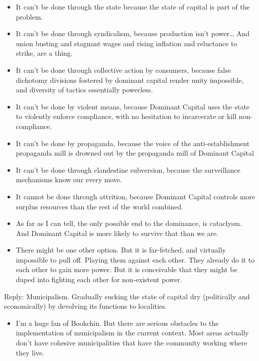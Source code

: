 \documentclass[
]{book}
\providecommand{\tightlist}{%
  \setlength{\itemsep}{0pt}\setlength{\parskip}{0pt}}
\begin{document}
\begin{itemize}
\item
  It can't be done through the state because the state of capital is part of the problem.
\item
  It can't be done through syndicalism, because production isn't power\ldots{} And union busting and stagnant wages and rising inflation and reluctance to strike, are a thing.
\item
  It can't be done through collective action by consumers, because false dichotomy divisions fostered by dominant capital render unity impossible, and diversity of tactics essentially powerless.
\item
  It can't be done by violent means, because Dominant Capital uses the state to violently enforce compliance, with no hesitation to incarcerate or kill non-compliance.
\item
  It can't be done by propaganda, because the voice of the anti-establishment propaganda mill is drowned out by the propaganda mill of Dominant Capital
\item
  It can't be done through clandestine subversion, because the surveillance mechanisms know our every move.
\item
  It cannot be done through attrition, because Dominant Capital controls more surplus resources than the rest of the world combined.
\item
  As far as I can tell, the only possible end to the dominance, is cataclysm. And Dominant Capital is more likely to survive that than we are.
\item
  There might be one other option. But it is far-fetched, and virtually impossible to pull off. Playing them against each other. They already do it to each other to gain more power. But it is conceivable that they might be duped into fighting each other for non-existent power.
\end{itemize}

Reply: Municipalism.
Gradually sucking the state of capital dry (politically and economically) by devolving its
functions to localities.

\begin{itemize}
\tightlist
\item
  I'm a huge fan of Bookchin.
  But there are serious obstacles to the implementation of municipalism in the current context. Most areas actually don't have cohesive municipalities that have the community working where they live.
\end{itemize}
\end{document}
